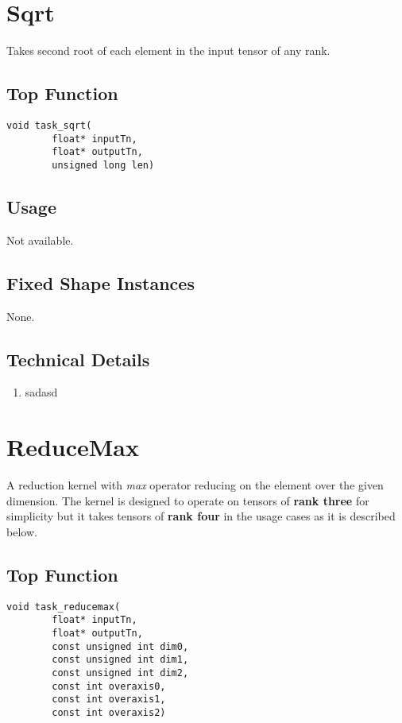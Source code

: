 \documentclass[•]{article}
\begin{document}
\pagebreak





\section{Sqrt}
Takes second root of each element in the input tensor of any rank.

\subsection{Top Function}
\begin{lstlisting}
void task_sqrt(
        float* inputTn,
        float* outputTn,
        unsigned long len)
\end{lstlisting}

\subsection{Usage}
Not available.

\subsection{Fixed Shape Instances}
None.

\subsection{Technical Details}
\begin{enumerate}
\item sadasd
\end{enumerate}






\pagebreak






\section{ReduceMax}
A reduction kernel with \textit{max} operator reducing on the element over the given dimension. The kernel is designed to operate on tensors of \textbf{rank three} for simplicity but it takes tensors of \textbf{rank four} in the usage cases as it is described below.
\subsection{Top Function}
\begin{lstlisting}
void task_reducemax(
        float* inputTn,
        float* outputTn,
		const unsigned int dim0,
		const unsigned int dim1,
		const unsigned int dim2,
		const int overaxis0,
		const int overaxis1,
		const int overaxis2)
\end{lstlisting}
\end{document}
